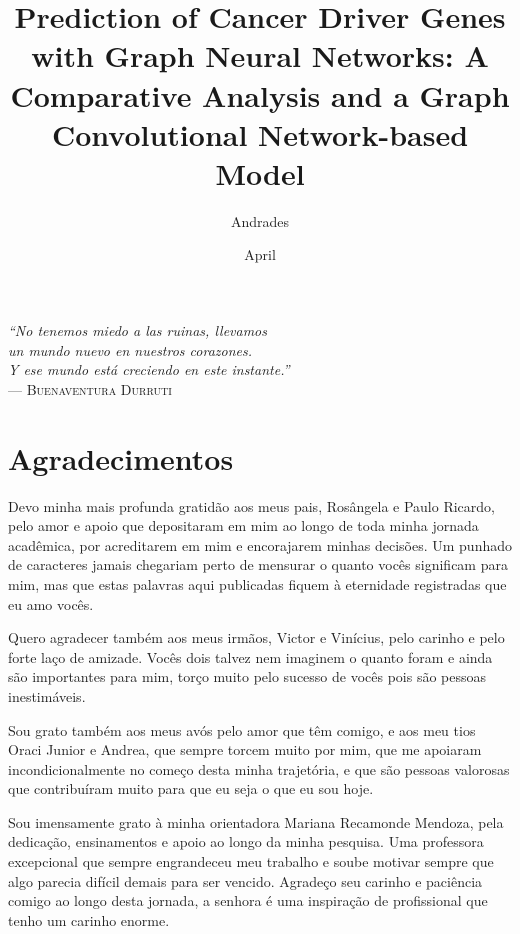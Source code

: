 \documentclass[ppgc, diss, english]{iiufrgs}
\title{Prediction of Cancer Driver Genes with Graph Neural Networks: A Comparative Analysis and a Graph Convolutional Network-based Model}
\author{Andrades}{Renan Soares de}
\date{April}{2023}
\begin{document}
\maketitle

\clearpage
\begin{flushright}
\mbox{}\vfill
{\sffamily\itshape
``No tenemos miedo a las ruinas, llevamos\\ un mundo nuevo en nuestros corazones.\\
Y ese mundo está creciendo en este instante.''\\}
--- \textsc{Buenaventura Durruti}
\end{flushright}




\chapter*{Agradecimentos}

Devo minha mais profunda gratidão aos meus pais, Rosângela e Paulo Ricardo, pelo amor e apoio que depositaram em mim ao longo de toda minha jornada acadêmica, por acreditarem em mim e encorajarem minhas decisões. Um punhado de caracteres jamais chegariam perto de mensurar o quanto vocês significam para mim, mas que estas palavras aqui publicadas fiquem à eternidade registradas que eu amo vocês.

Quero agradecer também aos meus irmãos, Victor e Vinícius, pelo carinho e pelo forte laço de amizade. Vocês dois talvez nem imaginem o quanto foram e ainda são importantes para mim, torço muito pelo sucesso de vocês pois são pessoas inestimáveis.

Sou grato também aos meus avós pelo amor que têm comigo, e aos meu tios Oraci Junior e Andrea, que sempre torcem muito por mim, que me apoiaram incondicionalmente no começo desta minha trajetória, e que são pessoas valorosas que contribuíram muito para que eu seja o que eu sou hoje.

Sou imensamente grato à minha orientadora Mariana Recamonde Mendoza, pela dedicação, ensinamentos e apoio ao longo da minha pesquisa. Uma professora excepcional que sempre engrandeceu meu trabalho e soube motivar sempre que algo parecia difícil demais para ser vencido. Agradeço seu carinho e paciência comigo ao longo desta jornada, a senhora é uma inspiração de profissional que tenho um carinho enorme.
\end{document}
